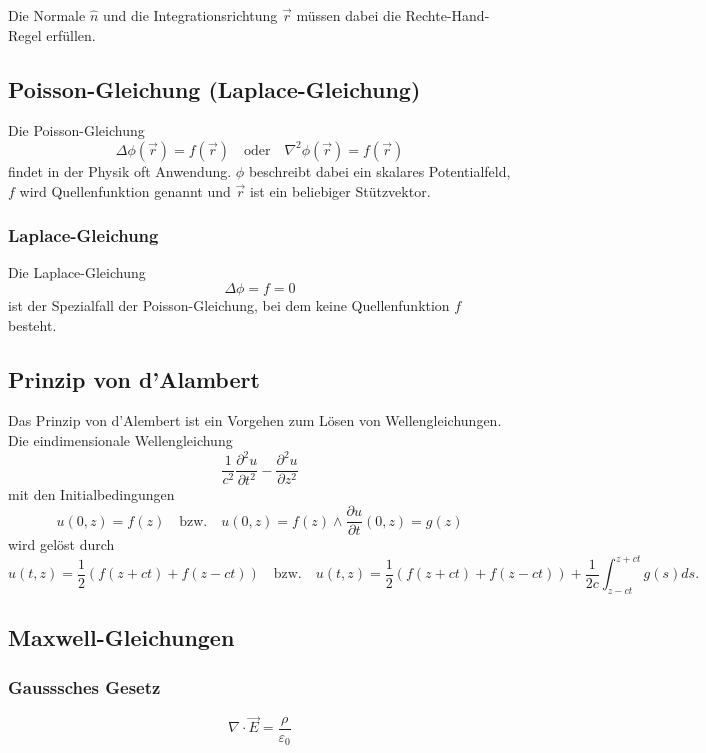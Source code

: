 Die Normale $\hat{n}$ und die Integrationsrichtung $\vec{r}$ müssen dabei die Rechte-Hand-Regel erfüllen.


\subsection{Poisson-Gleichung (Laplace-Gleichung)}
Die Poisson-Gleichung
\[
    \boxed{\Delta \phi (\vec{r})
    = f(\vec{r})}
    \hspace{1em}\text{oder}\hspace{1em}
    \boxed{\nabla^2 \phi (\vec{r})
    = f(\vec{r})}
\]
findet in der Physik oft Anwendung. $\phi$ beschreibt dabei ein skalares Potentialfeld, $f$ wird Quellenfunktion genannt und $\vec{r}$ ist ein beliebiger Stützvektor.

\subsubsection{Laplace-Gleichung}
Die Laplace-Gleichung
\[\boxed{\Delta \phi = f = 0}\] 
ist der Spezialfall der Poisson-Gleichung, bei dem keine Quellenfunktion $f$ besteht.


\subsection{Prinzip von d'Alambert}
Das Prinzip von d'Alembert ist ein Vorgehen zum Lösen von Wellengleichungen.
Die eindimensionale Wellengleichung
\[
    \frac{1}{c^2}\frac{\partial^2 u}{\partial t^2} - \frac{\partial^2 u}{\partial z^2}
\]
mit den Initialbedingungen
\[
    u(0, z) = f(z) 
    \hspace{1em}\text{bzw.}\hspace{1em}
    u(0, z) = f(z) \land \frac{\partial u}{\partial t} (0, z) = g(z)
\]
wird gelöst durch
\[
    u(t, z) = \frac{1}{2}(f(z + ct)+f(z-ct))
    \hspace{1em}\text{bzw.}\hspace{1em}
    u(t, z) = \frac{1}{2}(f(z + ct)+f(z-ct)) + \frac{1}{2c}\int_{z-ct}^{z+ct}g(s)ds.
\]


\subsection{Maxwell-Gleichungen}
\subsubsection{Gausssches Gesetz}
\[
    \nabla \cdot \vec{E} = \frac{\rho}{\varepsilon_0}
\]
